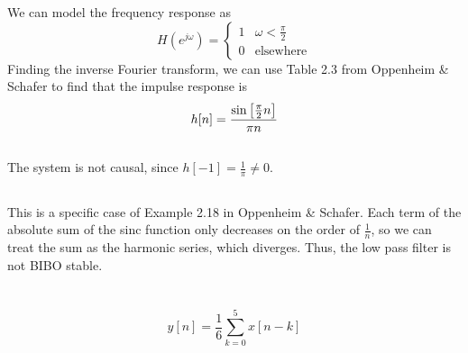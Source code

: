 \documentclass{article}
\begin{document}
We can model the frequency response as
\begin{equation}
    H(e^{j \omega}) =
    \begin{cases}
        1 & \omega < \frac{\pi}{2} \\
        0 & \text{elsewhere}
    \end{cases}
\end{equation}
Finding the inverse Fourier transform, we can use Table 2.3 from Oppenheim \& Schafer to find that the impulse response is
\begin{equation}
    h[n] = \frac{\sine\left[\frac{\pi}{2} n\right]}{\pi n}
\end{equation}

\subsection{}

The system is not causal, since \(h[-1] = \frac{1}{\pi} \neq 0\).

\subsection{}

This is a specific case of Example 2.18 in Oppenheim \& Schafer.
Each term of the absolute sum of the sinc function only decreases on the order of \(\frac{1}{n}\), so we can treat the sum as the harmonic series, which diverges.
Thus, the low pass filter is not BIBO stable.

\newpage
\section{}

\begin{equation}
    y[n] = \frac{1}{6} \sum_{k = 0}^5 x[n - k]
\end{equation}

\subsection{}
\end{document}
